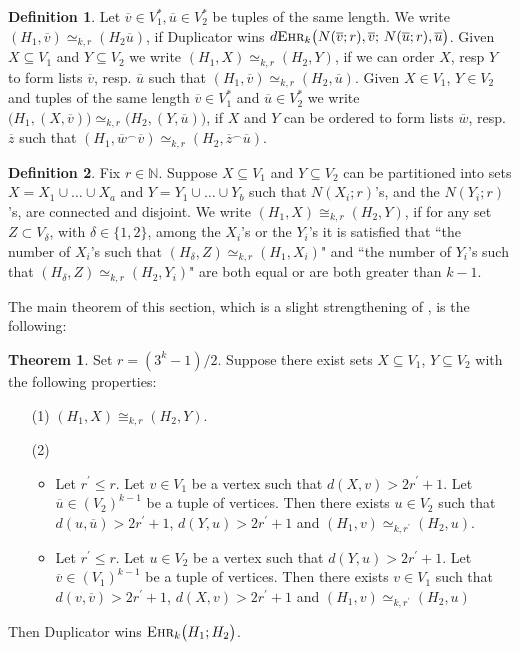 \documentclass[12pt,notitlepage,a4paper]{article}
\theoremstyle{definition}
\newtheorem{theorem}{Theorem}[section]
\newtheorem{definition}{Definition}[section]
\newcommand{\N}{\mathbb{N}}
\newcommand{\ehr}{\textsc{Ehr}}
\begin{document}
\begin{definition} \label{def:similar}
Let $\overline{v} \in V_1^*, 
\overline{u} \in V_2^*$ be tuples of the same length.
We write $(H_1,\overline{v})\simeq_{k,r}(H_2 \overline{u})$, if Duplicator wins
$d\ehr_k\big(N(\overline{v};r),
\overline{v};\, N(\overline{u};r),\overline{u}\big)$.
Given $X\subseteq V_1$ and $Y\subseteq V_2$
we write $(H_1,X)\simeq_{k,r} (H_2,Y)$, if we can order $X$, resp $Y$ to form
lists $\overline{v}$, resp. $\overline{u}$ such that 
$(H_1,\overline{v})\simeq_{k,r}(H_2,\overline{u})$. 
Given $X\in V_1$, $Y\in V_2$ and 
tuples of the same length $\overline{v}\in V_1^*$ and
$\overline{u}\in V_2^*$ we write
 $\big(H_1, (X,\overline{v})  \big)
\simeq_{k,r} \big(H_2, (Y,\overline{u})  \big)$, if
$X$ and $Y$ can be ordered to form lists
$\overline{w}$, resp. $\overline{z}$ such that
$(H_1,\overline{w}^\smallfrown \overline{v})
\simeq_{k,r} (H_2,\overline{z}^\smallfrown \overline{u})$. 
\end{definition}

\begin{definition} \label{def:analogous}
Fix $r\in \N$. Suppose $X\subseteq V_1$ and 
$Y\subseteq V_2$ can
be partitioned into sets $X=X_1\cup \dots \cup X_a$
and $Y=Y_1\cup \dots \cup Y_b$ 
such that $N(X_i;r)$'s, and the
$N(Y_i;r)$'s, are connected and disjoint. 
We write $(H_1,X)\cong_{k,r} (H_2,Y)$, 
if for any set $Z\subset V_\delta$, with $\delta\in \{1,2\}$,
among the $X_i$'s or the $Y_i$'s
it is satisfied that ``the number of $X_i$'s  
such that $(H_\delta, Z) \simeq_{k,r} (H_1,X_i)$" 
and ``the number of $Y_i$'s such that
$(H_\delta,Z)\simeq_{k,r} (H_2,Y_i)$"
are both equal or are both greater than $k-1$.
\end{definition}

The main theorem of this section, which
is a slight strengthening of \cite[Theorem 
2.6.7]{spencer2013strange}, is the following:

\begin{theorem}\label{thm:DuplicatorAux}
	Set $r=(3^k-1)/2$.
	Suppose there exist
	sets $X\subseteq V_1$, $Y\subseteq V_2$ with the 
	following properties:
	\begin{enumerate}
		\item[(1)] $(H_1,X)\cong_{k,r} (H_2,Y)$.
		\item[(2)]
		\begin{itemize}
			\item Let $r^\prime\leq r$. Let $v\in V_1$ be
			a vertex such that $d(X,v)> 2r^\prime + 1$. Let 
			$\overline{u}\in (V_2)^{k-1}$ be a tuple of vertices. 
			Then there exists $u\in V_2$ such that 
			$d(u,\overline{u})>2r^\prime+1$,
			$d(Y,u)>2r^\prime +1$ and
			$(H_1,v)\simeq_{k,r^\prime} (H_2,u)$.	
			\item Let $r^\prime\leq r$. Let $u\in V_2$ be
			a vertex such that $d(Y,u)> 2r^\prime + 1$. Let 
			$\overline{v}\in (V_1)^{k-1}$ be a tuple of vertices. 
			Then there exists $v\in V_1$ such that 
			$d(v,\overline{v})>2r^\prime+1$,
			$d(X,v)>2r^\prime +1$ and
			$(H_1,v)\simeq_{k,r^\prime} (H_2,u)$
		\end{itemize}
	\end{enumerate}
	Then Duplicator wins $\ehr_k\big(H_1;H_2\big)$.
\end{theorem}
\end{document}

